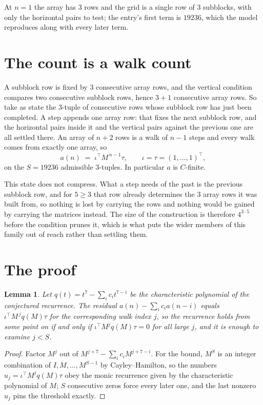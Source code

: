 \documentclass[11pt,a4paper]{article}
\theoremstyle{plain}
\newtheorem{lemma}[theorem]{Lemma}
\theoremstyle{definition}
\begin{document}
At $n=1$ the array has $3$ rows and the grid is a single row of $3$
subblocks, with only the horizontal pairs to test; the entry's first term is
$19236$, which the model reproduces along with every later term.

\section{The count is a walk count}

A subblock row is fixed by $3$ consecutive array rows, and the vertical condition compares
two consecutive subblock rows, hence $3+1$ consecutive array rows. So take as state the
$3$-tuple of consecutive rows whose subblock row has just been completed. A step appends one
array row: that fixes the next subblock row, and the horizontal pairs inside it and the
vertical pairs against the previous one are all settled there. An array of $n+2$ rows is
a walk of $n-1$ steps and every walk comes from exactly one array, so
\[
a(n)\;=\;\iota^{\!\top}M^{\,n-1}\tau,\qquad\iota=\tau=(1,\dots,1)^{\!\top},
\]
on the $S=19236$ admissible $3$-tuples. In particular $a$ is $C$-finite.

This state does not compress. What a step needs of the past is the previous subblock row, and
for $5\ge3$ that row already determines the $3$ array rows it was built from, so nothing
is lost by carrying the rows and nothing would be gained by carrying the matrices instead. The
size of the construction is therefore $4^{3\cdot5}$ before the condition prunes
it, which is what puts the wider members of this family out of reach rather than settling them.

\section{The proof}

\begin{lemma}\label{lem:crit}
Let $q(t)=t^{7}-\sum_i c_it^{7-i}$ be the characteristic polynomial of the
conjectured recurrence. The residual $a(n)-\sum_ic_ia(n-i)$ equals
$\iota^{\!\top}M^{\,j}q(M)\tau$ for the corresponding walk index $j$, so the recurrence
holds from some point on if and only if $\iota^{\!\top}M^{j}q(M)\tau=0$ for all large $j$,
and it is enough to examine $j<S$.
\end{lemma}

\begin{proof}
Factor $M^{j}$ out of $M^{j+7}-\sum_ic_iM^{j+7-i}$. For the bound, $M^{S}$
is an integer combination of $I,M,\dots,M^{S-1}$ by Cayley--Hamilton, so the numbers
$u_j=\iota^{\!\top}M^{j}q(M)\tau$ obey the monic recurrence given by the characteristic
polynomial of $M$; $S$ consecutive zeros force every later one, and the last nonzero $u_j$
pins the threshold exactly.
\end{proof}
\end{document}
